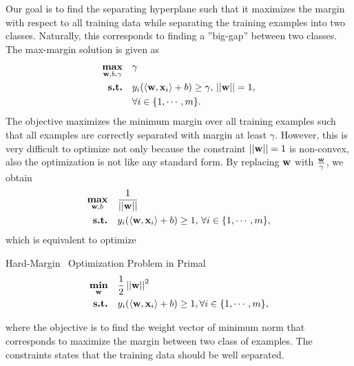 {Our goal is to find the separating hyperplane such that it maximizes the margin with respect to all training data while separating the training examples into two classes.
Naturally, this corresponds to finding a ''big-gap'' between two classes.
The max-margin solution is given as \citep{Bishop07}
\begin{align*}
	\underset{\mathbf {w},b,\gamma}{\textbf{max}} &\quad \gamma\\
	\textbf{s.t.} &\quad y_i(\langle \mathbf {w}, \mathbf {x}_i \rangle+b) \ge \gamma, \, \left|\left| \mathbf {w} \right|\right|=1,\\
	 &\quad \forall i\in\{1,\cdots,m\}.
\end{align*}
The objective maximizes the minimum margin over all training examples such that all examples are correctly separated with margin at least $\gamma$.
However, this is very difficult to optimize not only because the constraint $\left|\left| \mathbf {w} \right|\right|=1$ is non-convex, also the optimization is not like any standard form.
By replacing $\mathbf {w}$ with $\frac{\mathbf {w}}{\gamma}$, we obtain 
\begin{align*}
	\underset{\mathbf {w},b}{\textbf{max}} &\quad \frac{1}{\left|\left| \mathbf {w} \right|\right|}\\
	\textbf{s.t.} &\quad y_i(\langle \mathbf {w}, \mathbf {x}_i \rangle+b) \ge 1, \, \forall i\in\{1,\cdots,m\},
\end{align*}
which is equivalent to optimize
\begin{definition}{Hard-Margin \svm\ Optimization Problem in Primal}\label{hardsvmprimal}
	\begin{align*}
		\underset{\mathbf {w}}{\textbf{min}} & \quad\frac{1}{2}\left|\left| \mathbf {w} \right|\right|^2\\
		\textbf{s.t.} & \quad y_i(\langle \mathbf {w}, \mathbf {x}_i \rangle + b) \ge 1, \forall i\in\{1,\cdots,m\},
	\end{align*}
\end{definition}
where the objective is to find the weight vector of minimum norm that corresponds to maximize the margin between two class of examples.
The constraints states that the training data should be well separated.

}
